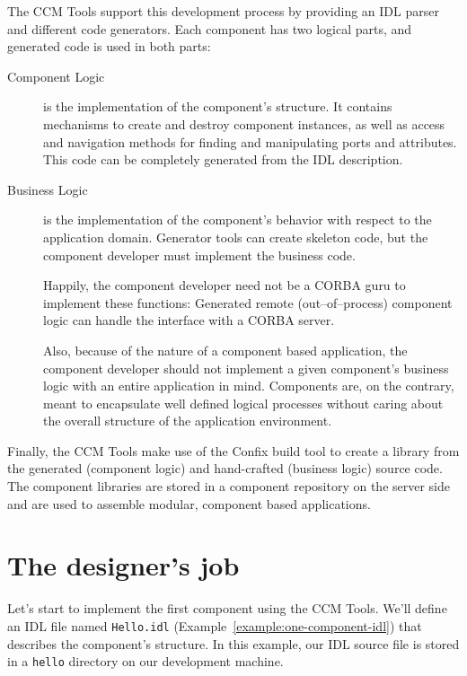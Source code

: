 The CCM Tools support this development process by providing an IDL parser and
different code generators. Each component has two logical parts, and generated
code is used in both parts:
\begin{description}
\item [Component Logic]
is the implementation of the component's structure. It contains mechanisms to
create and destroy component instances, as well as access and navigation methods
for finding and manipulating ports and attributes. This code can be completely
generated from the IDL description.

\item [Business Logic]
is the implementation of the component's behavior with respect to the
application domain. Generator tools can create skeleton code, but the component
developer must implement the business code.

Happily, the component developer need not be a CORBA guru to implement these
functions: Generated remote (out--of--process) component logic can handle the
interface with a CORBA server.

Also, because of the nature of a component based application, the component
developer should not implement a given component's business logic with an entire
application in mind. Components are, on the contrary, meant to encapsulate well
defined logical processes without caring about the overall structure of the
application environment.
\end{description}

Finally, the CCM Tools make use of the Confix build tool to create a library
from the generated (component logic) and hand-crafted (business logic) source
code. The component libraries are stored in a component repository on the server
side and are used to assemble modular, component based applications.

\section{The designer's job}

Let's start to implement the first component using the CCM Tools. We'll define
an IDL file named {\tt Hello.idl} (Example~\ref{example:one-component-idl}) that
describes the component's structure. In this example, our IDL source file is
stored in a {\tt hello} directory on our development machine.

